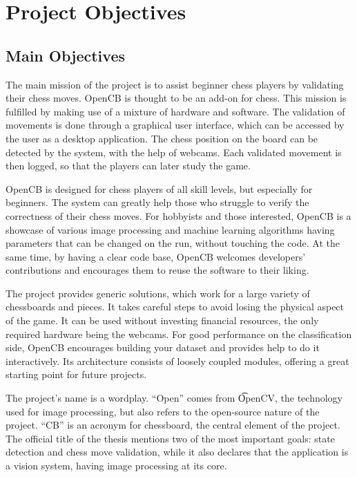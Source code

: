 \chapter{Project Objectives} \label{ch:project-objectives} \pagestyle{fancy}




\section{Main Objectives} \label{sec:main-objectives}

The main mission of the project is to assist beginner chess players by validating their chess moves. OpenCB is thought to be an add-on for chess. This mission is fulfilled by making use of a mixture of hardware and software. The validation of movements is done through a graphical user interface, which can be accessed by the user as a desktop application. The chess position on the board can be detected by the system, with the help of webcams. Each validated movement is then logged, so that the players can later study the game. 

OpenCB is designed for chess players of all skill levels, but especially for beginners. The system can greatly help those who struggle to verify the correctness of their chess moves. For hobbyists and those interested, OpenCB is a showcase of various image processing and machine learning algorithms having parameters that can be changed on the run, without touching the code. At the same time, by having a clear code base, OpenCB welcomes developers' contributions and encourages them to reuse the software to their liking. 

The project provides generic solutions, which work for a large variety of chessboards and pieces. It takes careful steps to avoid losing the physical aspect of the game. It can be used without investing financial resources, the only required hardware being the webcams. For good performance on the classification side, OpenCB encourages building your dataset and provides help to do it interactively. Its architecture consists of loosely coupled modules, offering a great starting point for future projects.

The project's name is a wordplay. ``Open'' comes from \t{OpenCV}, the technology used for image processing, but also refers to the open-source nature of the project. ``CB'' is an acronym for chessboard, the central element of the project. The official title of the thesis mentions two of the most important goals: state detection and chess move validation, while it also declares that the application is a vision system, having image processing at its core.




